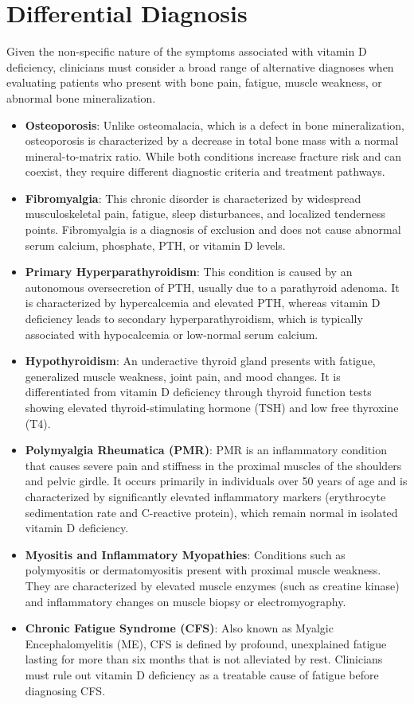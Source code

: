 \section*{Differential Diagnosis}
Given the non-specific nature of the symptoms associated with vitamin D deficiency, clinicians must consider a broad range of alternative diagnoses when evaluating patients who present with bone pain, fatigue, muscle weakness, or abnormal bone mineralization.

\begin{itemize}
    \item \textbf{Osteoporosis}: Unlike osteomalacia, which is a defect in bone mineralization, osteoporosis is characterized by a decrease in total bone mass with a normal mineral-to-matrix ratio. While both conditions increase fracture risk and can coexist, they require different diagnostic criteria and treatment pathways.
    \item \textbf{Fibromyalgia}: This chronic disorder is characterized by widespread musculoskeletal pain, fatigue, sleep disturbances, and localized tenderness points. Fibromyalgia is a diagnosis of exclusion and does not cause abnormal serum calcium, phosphate, PTH, or vitamin D levels.
    \item \textbf{Primary Hyperparathyroidism}: This condition is caused by an autonomous oversecretion of PTH, usually due to a parathyroid adenoma. It is characterized by hypercalcemia and elevated PTH, whereas vitamin D deficiency leads to secondary hyperparathyroidism, which is typically associated with hypocalcemia or low-normal serum calcium.
    \item \textbf{Hypothyroidism}: An underactive thyroid gland presents with fatigue, generalized muscle weakness, joint pain, and mood changes. It is differentiated from vitamin D deficiency through thyroid function tests showing elevated thyroid-stimulating hormone (TSH) and low free thyroxine (T4).
    \item \textbf{Polymyalgia Rheumatica (PMR)}: PMR is an inflammatory condition that causes severe pain and stiffness in the proximal muscles of the shoulders and pelvic girdle. It occurs primarily in individuals over 50 years of age and is characterized by significantly elevated inflammatory markers (erythrocyte sedimentation rate and C-reactive protein), which remain normal in isolated vitamin D deficiency.
    \item \textbf{Myositis and Inflammatory Myopathies}: Conditions such as polymyositis or dermatomyositis present with proximal muscle weakness. They are characterized by elevated muscle enzymes (such as creatine kinase) and inflammatory changes on muscle biopsy or electromyography.
    \item \textbf{Chronic Fatigue Syndrome (CFS)}: Also known as Myalgic Encephalomyelitis (ME), CFS is defined by profound, unexplained fatigue lasting for more than six months that is not alleviated by rest. Clinicians must rule out vitamin D deficiency as a treatable cause of fatigue before diagnosing CFS.
\end{itemize}


